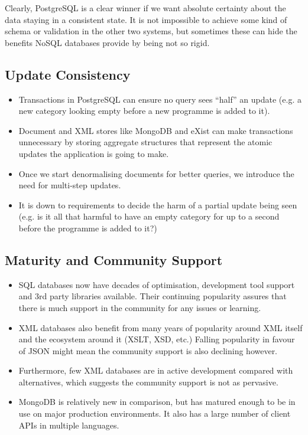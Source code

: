 \documentclass[11pt,a4paper]{article}
\begin{document}
Clearly, PostgreSQL is a clear winner if we want absolute certainty
about the data staying in a consistent state. It is not impossible
to achieve some kind of schema or validation in the other two systems,
but sometimes these can hide the benefits NoSQL databases provide
by being not so rigid.

\subsection{Update Consistency}

\begin{itemize}
  \item Transactions in PostgreSQL can ensure no query sees
    ``half'' an update (e.g. a new category looking empty
    before a new programme is added to it).
  \item Document and XML stores like MongoDB and eXist can make
    transactions unnecessary by storing aggregate structures
    that represent the atomic updates the application is going to make.
  \item Once we start denormalising documents for better queries,
    we introduce the need for multi-step updates.
  \item It is down to requirements to decide the harm of a partial
    update being seen (e.g. is it all that harmful to have an empty
    category for up to a second before the programme is added to it?)
\end{itemize}

\subsection{Maturity and Community Support}

\begin{itemize}
  \item SQL databases now have decades of optimisation, development tool
    support and 3rd party libraries available. Their continuing
    popularity assures that there is much support in the community for any
    issues or learning.
  \item XML databases also benefit from many years of popularity around
    XML itself and the ecosystem around it (XSLT, XSD, etc.) Falling popularity
    in favour of JSON might mean the community support is also declining however.
  \item Furthermore, few XML databases are in active development compared
    with alternatives, which suggests the community support is not as
    pervasive.
  \item MongoDB is relatively new in comparison, but has matured enough
    to be in use on major production environments. \cite{mongo-production} It
    also has a large number of client APIs in multiple languages.
\end{itemize}
\end{document}
